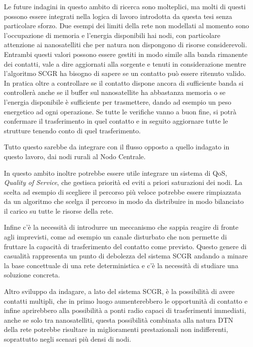 \documentclass[12pt,a4paper,oneside]{book}
\begin{document}
	Le future indagini in questo ambito di ricerca sono molteplici, ma molti di questi possono essere integrati nella logica di lavoro introdotta da questa tesi senza particolare sforzo. Due esempi dei limiti della rete non modellati al momento sono l'occupazione di memoria e l'energia disponibili hai nodi, con particolare attenzione ai nanosatelliti che per natura non dispongono di risorse considerevoli. Entrambi questi valori possono essere gestiti in modo simile alla banda rimanente dei contatti, vale a dire aggiornati alla sorgente e tenuti in considerazione mentre l'algoritmo SCGR ha bisogno di sapere se un contatto può essere ritenuto valido. In pratica oltre a controllare se il contatto dispone ancora di sufficiente banda si controllerà anche se il buffer sul nanosatellite ha abbastanza memoria o se l'energia disponibile è sufficiente per trasmettere, dando ad esempio un peso energetico ad ogni operazione. Se tutte le verifiche vanno a buon fine, si potrà confermare il trasferimento in quel contatto e in seguito aggiornare tutte le strutture tenendo conto di quel trasferimento.

	Tutto questo sarebbe da integrare con il flusso opposto a quello indagato in questo lavoro, dai nodi rurali al Nodo Centrale.
	
	In questo ambito inoltre potrebbe essere utile integrare un sistema di QoS, {\it Quality of Service},  che gestisca priorità ed eviti a priori saturazioni dei nodi. La scelta ad esempio di scegliere il percorso più veloce potrebbe essere rimpiazzata da un algoritmo che scelga il percorso in modo da distribuire in modo bilanciato il carico su tutte le risorse della rete. 
	
	Infine c'è la necessità di introdurre un meccanismo che sappia reagire di fronte agli imprevisti, come ad esempio un canale disturbato che non permette di fruttare la capacità di trasferimento del contatto come previsto. Questo genere di casualità rappresenta un punto di debolezza del sistema SCGR andando a minare la base concettuale di una rete deterministica e c'è la necessità di studiare una soluzione concreta.
	
	Altro sviluppo da indagare, a lato del sistema SCGR, è la possibilità di avere contatti multipli, che in primo luogo aumenterebbero le opportunità di contatto e infine aprirebbero alla possibilità a ponti radio capaci di trasferimenti immediati, anche se solo tra nanosatelliti, questa possibilità combinata alla natura DTN della rete potrebbe risultare in miglioramenti prestazionali non indifferenti, soprattutto negli scenari più densi di nodi.
	
	
	
	
\end{document}
